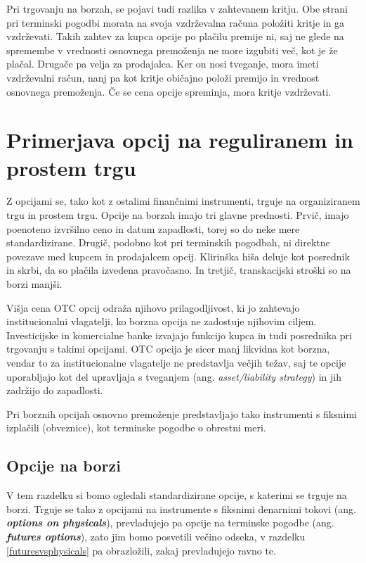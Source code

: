 \documentclass[a4paper]{article}
\begin{document}
Pri trgovanju na borzah, se pojavi tudi razlika v zahtevanem kritju.
Obe strani pri terminski pogodbi morata na svoja vzdrževalna računa položiti kritje in ga vzdrževati. Takih zahtev za kupca opcije
po plačilu premije ni, saj ne glede na spremembe v vrednosti osnovnega premoženja ne more izgubiti več, kot je že plačal.
Drugače pa velja za prodajalca. Ker on nosi tveganje, mora imeti vzdrževalni račun, nanj pa kot kritje običajno položi premijo in vrednost osnovnega premoženja. Če se cena 
opcije spreminja, mora kritje vzdrževati.

\section{Primerjava opcij na reguliranem in prostem trgu}
Z opcijami se, tako kot z ostalimi finančnimi instrumenti, trguje na organiziranem trgu in prostem trgu. Opcije na borzah imajo tri glavne prednosti. 
Prvič, imajo poenoteno izvršilno ceno in datum zapadlosti, torej so do neke mere standardizirane. Drugič, podobno kot pri terminskih pogodbah, ni direktne povezave
med kupcem in prodajalcem opcij. Klirinška hiša deluje kot posrednik in skrbi, da so plačila izvedena pravočasno. In tretjič, transkacijski
stroški so na borzi manjši. 

Višja cena OTC opcij odraža njihovo prilagodljivost, ki jo zahtevajo institucionalni vlagatelji, ko borzna opcija ne zadostuje
njihovim ciljem. Investicijske in komercialne banke izvajajo funkcijo kupca in tudi posrednika pri trgovanju s takimi
opcijami. OTC opcija je sicer manj likvidna kot borzna, vendar to za institucionalne vlagatelje ne predstavlja večjih težav, 
saj te opcije uporabljajo kot del upravljaja s tveganjem (ang. \textit{asset/liability strategy}) in jih zadržijo do zapadlosti.

Pri borznih opcijah osnovno premoženje predstavljajo tako instrumenti s fiksnimi izplačili (obveznice),
kot terminske pogodbe o obrestni meri.

\subsection{Opcije na borzi}
V tem razdelku si bomo ogledali standardizirane opcije, s katerimi se trguje na borzi. Trguje se 
tako z opcijami na instrumente s fiksnimi denarnimi tokovi  (ang. \textit{\textbf{options on physicals}}), 
prevladujejo pa opcije na terminske pogodbe (ang. \textit{\textbf{futures options}}),
zato jim bomo posvetili večino odseka, v razdelku \ref{futuresvsphysicals} pa obrazložili, zakaj prevladujejo ravno te.
\end{document}

